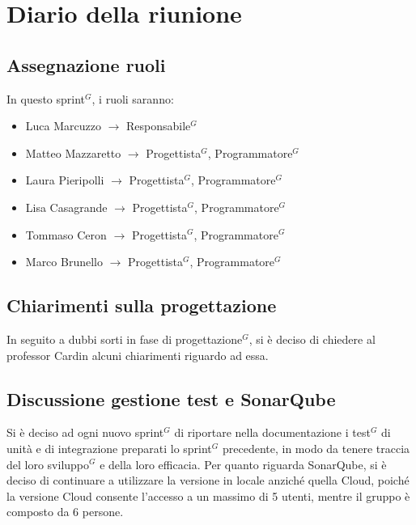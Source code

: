 \section{Diario della riunione}

\subsection{Assegnazione ruoli}
In questo sprint$^G$, i ruoli saranno:
\begin{itemize}
	\item Luca Marcuzzo $\rightarrow$ Responsabile$^G$
	\item Matteo Mazzaretto $\rightarrow$ Progettista$^G$, Programmatore$^G$
	\item Laura Pieripolli $\rightarrow$ Progettista$^G$, Programmatore$^G$
	\item Lisa Casagrande $\rightarrow$ Progettista$^G$, Programmatore$^G$
	\item Tommaso Ceron $\rightarrow$ Progettista$^G$, Programmatore$^G$
	\item Marco Brunello $\rightarrow$ Progettista$^G$, Programmatore$^G$
\end{itemize}

\subsection{Chiarimenti sulla progettazione}
In seguito a dubbi sorti in fase di progettazione$^G$, si è deciso di chiedere al professor Cardin alcuni chiarimenti riguardo ad essa.

\subsection{Discussione gestione test e SonarQube}
Si è deciso ad ogni nuovo sprint$^G$ di riportare nella documentazione i test$^G$ di unità e di integrazione preparati lo sprint$^G$ precedente, in modo da tenere traccia del loro sviluppo$^G$ e della loro efficacia. 
Per quanto riguarda SonarQube, si è deciso di continuare a utilizzare la versione in locale anziché quella Cloud, poiché la versione Cloud consente l’accesso a un massimo di 5 utenti, mentre il gruppo è composto da 6 persone.